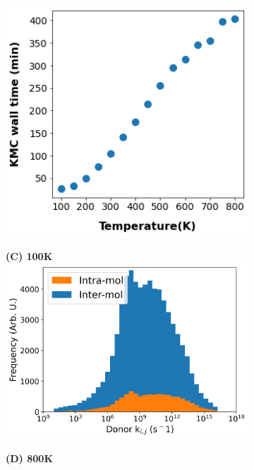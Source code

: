 \begin{figure}[]
\begin{subfigure}{.5\textwidth}
    \includegraphics[width=\textwidth]{figures/temp_simtime_plot.png}
    \newline
\end{subfigure}
\begin{subfigure}{.5\textwidth}
    \textbf{(C) 100K}
    \centering
    \includegraphics[width=\textwidth]{figures/donor_hopping_rate_clusters_temp100.png}
\end{subfigure}%
\begin{subfigure}{.5\textwidth}
    \textbf{(D) 800K}
    \centering

\end{subfigure}
\end{figure}
